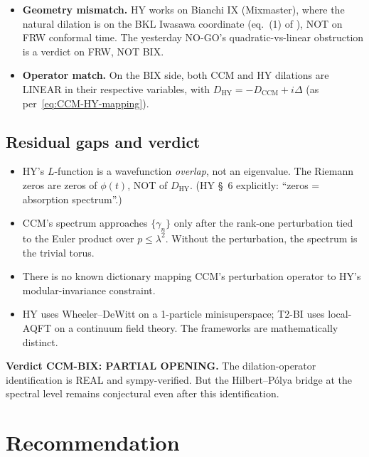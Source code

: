 \documentclass[11pt,a4paper]{article}
\theoremstyle{definition}
\begin{document}
\begin{itemize}
  \item \textbf{Geometry mismatch.} HY works on Bianchi IX
  (Mixmaster), where the natural dilation is on the BKL Iwasawa
  coordinate (eq.~(1) of \cite{HartnollYang2025}), NOT on FRW
  conformal time. The yesterday NO-GO's quadratic-vs-linear obstruction
  is a verdict on FRW, NOT BIX.
  \item \textbf{Operator match.} On the BIX side, both CCM and HY
  dilations are LINEAR in their respective variables, with
  $D_{\mathrm{HY}} = -D_{\mathrm{CCM}} + i \Delta$ (as
  per~\eqref{eq:CCM-HY-mapping}).
\end{itemize}

\subsection{Residual gaps and verdict}

\begin{itemize}
  \item HY's $L$-function is a wavefunction \emph{overlap}, not an
  eigenvalue. The Riemann zeros are zeros of $\phi(t)$, NOT of
  $D_{\mathrm{HY}}$. (HY \S~6 explicitly: ``zeros = absorption spectrum''.)
  \item CCM's spectrum approaches $\{\gamma_n\}$ only after the
  rank-one perturbation tied to the Euler product over $p \le \lambda^2$.
  Without the perturbation, the spectrum is the trivial torus.
  \item There is no known dictionary mapping CCM's perturbation
  operator to HY's modular-invariance constraint.
  \item HY uses Wheeler--DeWitt on a 1-particle minisuperspace; T2-BI
  uses local-AQFT on a continuum field theory. The frameworks are
  mathematically distinct.
\end{itemize}

\textbf{Verdict CCM-BIX: PARTIAL OPENING.} The dilation-operator
identification is REAL and sympy-verified. But the Hilbert--P\'olya
bridge at the spectral level remains conjectural even after this
identification.

\section{Recommendation}
\end{document}
